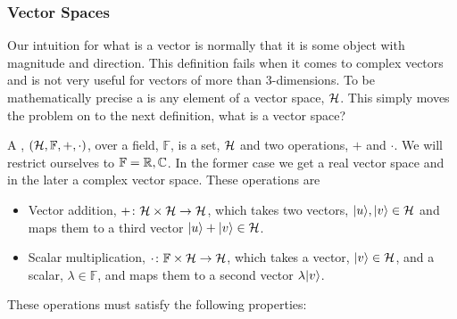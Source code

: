     \subsubsection{Vector Spaces}\label{sec:vector spaces}
    Our intuition for what is a vector is normally that it is some object with magnitude and direction.
    This definition fails when it comes to complex vectors and is not very useful for vectors of more than 3-dimensions.
    To be mathematically precise a  is any element of a vector space, \(\mathcal{H}\).
    This simply moves the problem on to the next definition, what is a vector space?
    
    A , \((\mathcal{H}, \mathbb{F}, +, \cdot)\), over a field, \(\mathbb{F}\), is a set, \(\mathcal{H}\) and two operations, \(+\) and \(\cdot\).
    We will restrict ourselves to \(\mathbb{F} = \mathbb{R}, \mathbb{C}\).
    In the former case we get a real vector space and in the later a complex vector space.
    These operations are
    \begin{itemize}
        \item Vector addition, \({+}\colon\mathcal{H}\times\mathcal{H}\to\mathcal{H}\), which takes two vectors, \(\vert {u} \rangle, \vert {v} \rangle\in\mathcal{H}\) and maps them to a third vector \(\vert {u} \rangle + \vert {v} \rangle\in\mathcal{H}\).
        \item Scalar multiplication, \({\cdot}\colon\mathbb{F}\times\mathcal{H}\to\mathcal{H}\), which takes a vector, \(\vert {v} \rangle\in\mathcal{H}\), and a scalar, \(\lambda\in\mathbb{F}\), and maps them to a second vector \(\lambda\vert {v} \rangle\).
    \end{itemize}
    These operations must satisfy the following properties:
